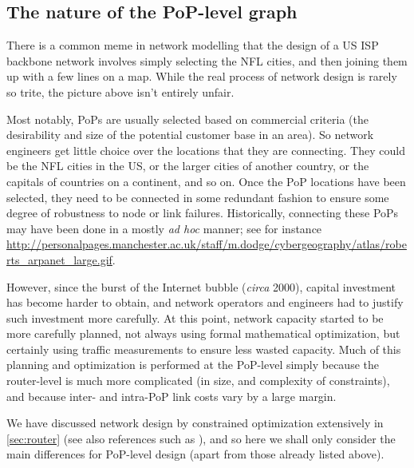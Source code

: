 \subsection{The nature of the PoP-level graph}

There is a common meme in network modelling that the design of a US ISP backbone 
network involves simply selecting the NFL cities, and then joining them up with 
a few lines on a map. While the real process of network design is rarely so trite, 
the picture above isn't entirely unfair. 

Most notably, PoPs are usually selected based on commercial criteria (\eg the 
desirability and size of the potential customer base in an area). So network 
engineers get little choice over the locations that they are connecting. They 
could be the NFL cities in the US, or the larger cities of another country, or 
the capitals of countries on a continent, and so on. 
Once the PoP locations have been selected, they need to be connected in some 
redundant fashion to ensure some degree of robustness to node or link failures. 
Historically, connecting these PoPs may have been done in a mostly {\em ad hoc} 
manner; see for instance \url{http://personalpages.manchester.ac.uk/staff/m.dodge/cybergeography/atlas/roberts_arpanet_large.gif}. 

However, since the burst of the Internet bubble ({\em circa} 2000), capital 
investment has become harder to obtain, and network operators and engineers 
had to justify such investment more carefully. At this point, network capacity 
started to be more carefully planned, not always using formal mathematical 
optimization, but certainly using traffic measurements to ensure less wasted 
capacity. Much of this planning and optimization is performed at the PoP-level 
simply because the router-level is much more complicated (in size, and complexity of
constraints), and because inter- and intra-PoP link costs vary by a large margin.

We have discussed network design by constrained optimization extensively in 
\autoref{sec:router} (see also references such as \cite{Li04}), and so here 
we shall only consider the main differences for PoP-level design (apart from 
those already listed above).

